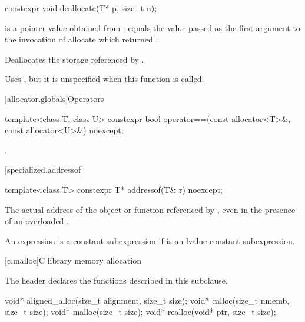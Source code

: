 %
\begin{itemdecl}
constexpr void deallocate(T* p, size_t n);
\end{itemdecl}

\begin{itemdescr}
\pnum
\expects
{} is a pointer value obtained from .
 equals the value passed as the first argument
to the invocation of allocate which returned .

\pnum
\effects
Deallocates the storage referenced by .

\pnum
\remarks
Uses
,
but it is unspecified
when this function is called.
\end{itemdescr}

[allocator.globals]{Operators}

%
\begin{itemdecl}
template<class T, class U>
  constexpr bool operator==(const allocator<T>&, const allocator<U>&) noexcept;
\end{itemdecl}

\begin{itemdescr}
\pnum
\returns
{}.
\end{itemdescr}

[specialized.addressof]{}

%
\begin{itemdecl}
template<class T> constexpr T* addressof(T& r) noexcept;
\end{itemdecl}

\begin{itemdescr}
\pnum
\returns
The actual address of the object or function referenced by , even in the
presence of an overloaded .

\pnum
\remarks
An expression 
is a constant subexpression
if  is an lvalue constant subexpression.
\end{itemdescr}

[c.malloc]{C library memory allocation}

\pnum
\begin{note}
The header 
declares the functions described in this subclause.
\end{note}

%
%
%
%
\begin{itemdecl}
void* aligned_alloc(size_t alignment, size_t size);
void* calloc(size_t nmemb, size_t size);
void* malloc(size_t size);
void* realloc(void* ptr, size_t size);
\end{itemdecl}

